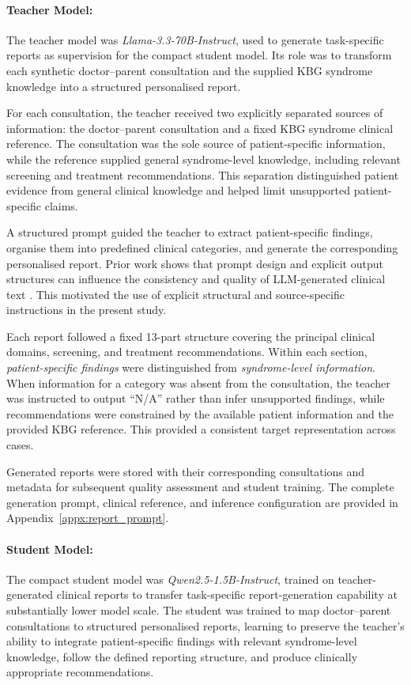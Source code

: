 \documentclass[ %
                    author={Aman Kumar Singh},
                supervisor={Dr. Edwin Simpson},
                    degree={MSc},
                     title={Quality-Aware Knowledge Distillation of Large Language Models for Efficient Personalised Clinical Report Generation},
                  subtitle={},
                      type={},
                      year={2021}]{dissertation}
\begin{document}
\paragraph{Teacher Model:}
The teacher model was \textit{Llama-3.3-70B-Instruct}, used to generate
task-specific reports as supervision for the compact student model. Its role
was to transform each synthetic doctor--parent consultation and the supplied
KBG syndrome knowledge into a structured personalised report.

For each consultation, the teacher received two explicitly separated sources
of information: the doctor--parent consultation and a fixed KBG syndrome
clinical reference. The consultation was the sole source of patient-specific
information, while the reference supplied general syndrome-level knowledge,
including relevant screening and treatment recommendations. This separation
distinguished patient evidence from general clinical knowledge and helped
limit unsupported patient-specific claims.

A structured prompt guided the teacher to extract patient-specific findings,
organise them into predefined clinical categories, and generate the
corresponding personalised report. Prior work shows that prompt design and
explicit output structures can influence the consistency and quality of
LLM-generated clinical text
\cite{huang_critical_2024,tang_ignitioninnovators_2024, yao_clinicians_2024}.
This motivated the use of explicit structural and source-specific
instructions in the present study.

Each report followed a fixed 13-part structure covering the principal
clinical domains, screening, and treatment recommendations. Within each
section, \textit{patient-specific findings} were distinguished from
\textit{syndrome-level information}. When information for a category was
absent from the consultation, the teacher was instructed to output ``N/A''
rather than infer unsupported findings, while recommendations were
constrained by the available patient information and the provided KBG
reference. This provided a consistent target representation across cases.

Generated reports were stored with their corresponding consultations and
metadata for subsequent quality assessment and student training. The
complete generation prompt, clinical reference, and inference configuration
are provided in Appendix~\ref{appx:report_prompt}.

\paragraph{Student Model:}
The compact student model was \textit{Qwen2.5-1.5B-Instruct}, trained on
teacher-generated clinical reports to transfer task-specific
report-generation capability at substantially lower model scale. The student
was trained to map doctor--parent consultations to structured personalised
reports, learning to preserve the teacher's ability to integrate
patient-specific findings with relevant syndrome-level knowledge, follow the
defined reporting structure, and produce clinically appropriate
recommendations.
\end{document}
